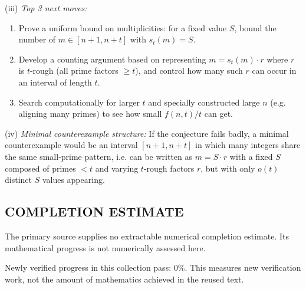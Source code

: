 (iii) \emph{Top 3 next moves:}
\begin{enumerate}
\item Prove a uniform bound on multiplicities: for a fixed value $S$, bound the number of $m\in[n+1,n+t]$ with $s_t(m)=S$.
\item Develop a counting argument based on representing $m=s_t(m)\cdot r$ where $r$ is $t$-rough (all prime factors $\ge t$), and control how many such $r$ can occur in an interval of length $t$.
\item Search computationally for larger $t$ and specially constructed large $n$ (e.g. aligning many primes) to see how small $f(n,t)/t$ can get.
\end{enumerate}

(iv) \emph{Minimal counterexample structure:} If the conjecture fails badly, a minimal counterexample would be an interval $[n+1,n+t]$ in which many integers share the same small-prime pattern, i.e. can be written as $m=S\cdot r$ with a fixed $S$ composed of primes $<t$ and varying $t$-rough factors $r$, but with only $o(t)$ distinct $S$ values appearing.




\subsection*{COMPLETION ESTIMATE}
The primary source supplies no extractable numerical completion estimate. Its mathematical progress is not numerically assessed here.

Newly verified progress in this collection pass: $0\%$. This measures new verification work, not the amount of mathematics achieved in the reused text.
